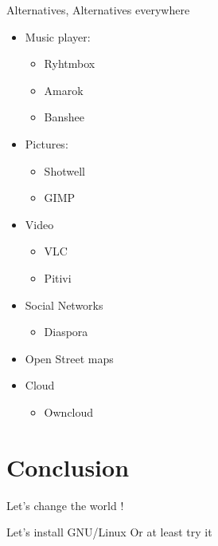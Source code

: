 \documentclass[xcolor={usenames,dvipsnames}]{beamer}
\newcommand{\sectiontitle}{}
\newcommand{\newHsection}[1]{\renewcommand{\sectiontitle}{#1}\section*{#1}}
\begin{document}
\begin{frame}{Alternatives, Alternatives everywhere}
    \begin{itemize}
        \item Music player:
            \begin{itemize}
                \item Ryhtmbox
                \item Amarok
                \item Banshee
            \end{itemize}
        \item Pictures:
            \begin{itemize}
                \item Shotwell
                \item GIMP
            \end{itemize}
        \item Video
            \begin{itemize}
                \item VLC
                \item Pitivi
            \end{itemize}
        \item Social Networks
            \begin{itemize}
                \item Diaspora
            \end{itemize}
        \item Open Street maps
        \item Cloud
            \begin{itemize}
                \item Owncloud
            \end{itemize}
    \end{itemize}
\end{frame}

\newHsection{Conclusion}

\begin{frame}{Let's change the world !}
    \begin{block}{Let's install GNU/Linux}
        Or at least try it
    \end{block}
\end{frame}
\setcounter{finalframe}{\value{framenumber}}


\end{document}
